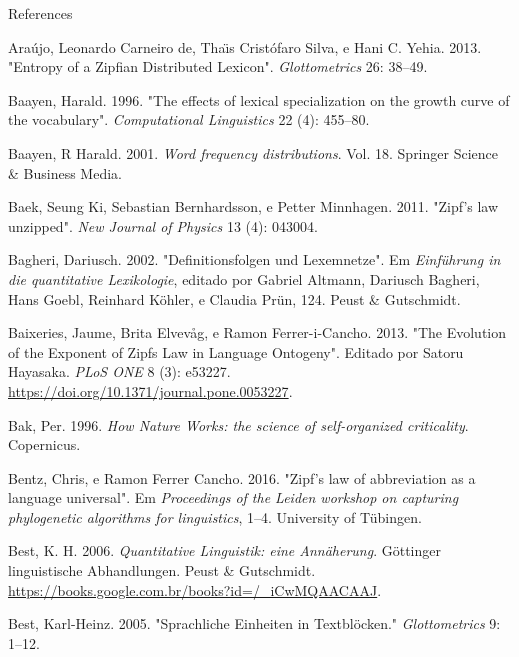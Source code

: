 \documentclass[
  ignorenonframetext,
  aspectratio=169]{beamer}
\newlength{\cslhangindent}
\newlength{\cslentryspacingunit} %
\newenvironment{CSLReferences}[2] %
 {%
  \setlength{\parindent}{0pt}
  \ifodd #1
  \let\oldpar\par
  \def\par{\hangindent=\cslhangindent\oldpar}
  \fi
  \setlength{\parskip}{#2\cslentryspacingunit}
 }%
 {}
\begin{document}
\begin{frame}[allowframebreaks]{References}
\begin{CSLReferences}{1}{0}
\leavevmode{}%
Araújo, Leonardo Carneiro de, Thaı̈s Cristófaro Silva, e Hani C. Yehia.
2013. {"Entropy of a Zipfian Distributed Lexicon"}. \emph{Glottometrics}
26: 38--49.

\leavevmode{}%
Baayen, Harald. 1996. {"The effects of lexical specialization on the
growth curve of the vocabulary"}. \emph{Computational Linguistics} 22
(4): 455--80.

\leavevmode{}%
Baayen, R Harald. 2001. \emph{Word frequency distributions}. Vol. 18.
Springer Science \& Business Media.

\leavevmode{}%
Baek, Seung Ki, Sebastian Bernhardsson, e Petter Minnhagen. 2011.
{"Zipf's law unzipped"}. \emph{New Journal of Physics} 13 (4): 043004.

\leavevmode{}%
Bagheri, Dariusch. 2002. {"Definitionsfolgen und Lexemnetze"}. Em
\emph{Einführung in die quantitative Lexikologie}, editado por Gabriel
Altmann, Dariusch Bagheri, Hans Goebl, Reinhard Köhler, e Claudia Prün,
124. Peust \& Gutschmidt.

\leavevmode{}%
Baixeries, Jaume, Brita Elvevåg, e Ramon Ferrer-i-Cancho. 2013. {"The
Evolution of the Exponent of Zipf{\textquotesingle}s Law in Language
Ontogeny"}. Editado por Satoru Hayasaka. \emph{{PLoS} {ONE}} 8 (3):
e53227. \url{https://doi.org/10.1371/journal.pone.0053227}.

\leavevmode{}%
Bak, Per. 1996. \emph{How Nature Works: the science of self-organized
criticality}. Copernicus.

\leavevmode{}%
Bentz, Chris, e Ramon Ferrer Cancho. 2016. {"Zipf's law of abbreviation
as a language universal"}. Em \emph{Proceedings of the Leiden workshop
on capturing phylogenetic algorithms for linguistics}, 1--4. University
of T{ü}bingen.

\leavevmode{}%
Best, K. H. 2006. \emph{Quantitative Linguistik: eine Ann{ä}herung}.
G{ö}ttinger linguistische Abhandlungen. Peust \& Gutschmidt.
\url{https://books.google.com.br/books?id=/_iCwMQAACAAJ}.

\leavevmode{}%
Best, Karl-Heinz. 2005. {"Sprachliche Einheiten in Textbl{ö}cken."}
\emph{Glottometrics} 9: 1--12.


\end{CSLReferences}
\end{frame}
\end{document}
